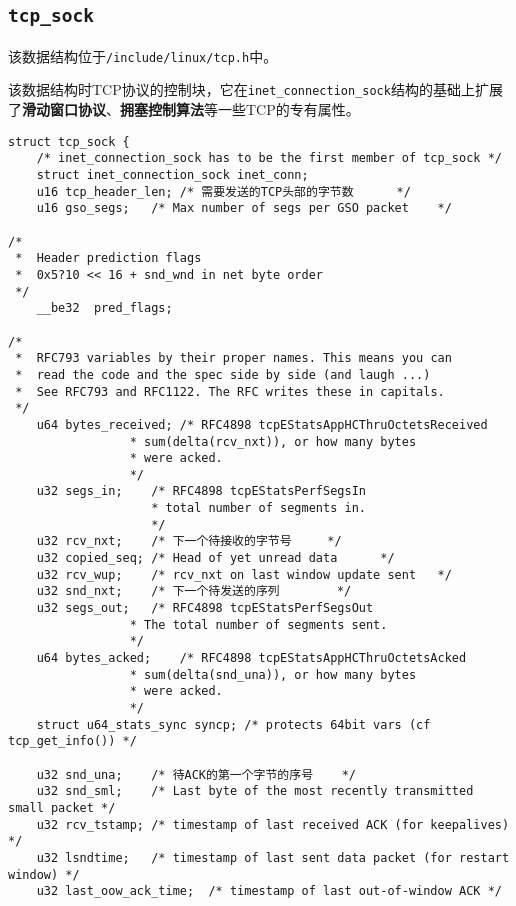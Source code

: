         \subsection{\texttt{tcp_sock}}

            该数据结构位于\texttt{/include/linux/tcp.h}中。

            该数据结构时TCP协议的控制块，它在\texttt{inet_connection_sock}结构的基础上扩展了\textbf{滑动窗口协议}、\textbf{拥塞控制算法}等一些TCP的专有属性。
            
\begin{verbatim}
struct tcp_sock {
    /* inet_connection_sock has to be the first member of tcp_sock */
    struct inet_connection_sock inet_conn;
    u16 tcp_header_len; /* 需要发送的TCP头部的字节数      */
    u16 gso_segs;   /* Max number of segs per GSO packet    */

/*
 *  Header prediction flags
 *  0x5?10 << 16 + snd_wnd in net byte order
 */
    __be32  pred_flags;

/*
 *  RFC793 variables by their proper names. This means you can
 *  read the code and the spec side by side (and laugh ...)
 *  See RFC793 and RFC1122. The RFC writes these in capitals.
 */
    u64 bytes_received; /* RFC4898 tcpEStatsAppHCThruOctetsReceived
                 * sum(delta(rcv_nxt)), or how many bytes
                 * were acked.
                 */
    u32 segs_in;    /* RFC4898 tcpEStatsPerfSegsIn
                 	* total number of segments in.
                 	*/
    u32 rcv_nxt;    /* 下一个待接收的字节号     */
    u32 copied_seq; /* Head of yet unread data      */
    u32 rcv_wup;    /* rcv_nxt on last window update sent   */
    u32 snd_nxt;    /* 下一个待发送的序列        */
    u32 segs_out;   /* RFC4898 tcpEStatsPerfSegsOut
                 * The total number of segments sent.
                 */
    u64 bytes_acked;    /* RFC4898 tcpEStatsAppHCThruOctetsAcked
                 * sum(delta(snd_una)), or how many bytes
                 * were acked.
                 */
    struct u64_stats_sync syncp; /* protects 64bit vars (cf tcp_get_info()) */

    u32 snd_una;    /* 待ACK的第一个字节的序号    */
    u32 snd_sml;    /* Last byte of the most recently transmitted small packet */
    u32 rcv_tstamp; /* timestamp of last received ACK (for keepalives) */
    u32 lsndtime;   /* timestamp of last sent data packet (for restart window) */
    u32 last_oow_ack_time;  /* timestamp of last out-of-window ACK */


\end{verbatim}
